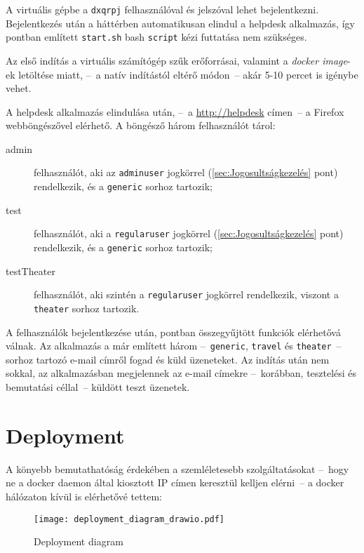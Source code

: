 A virtuális gépbe a \texttt{dxqrpj} felhasználóval és jelszóval lehet bejelentkezni. Bejelentkezés után a háttérben automatikusan elindul a helpdesk alkalmazás, így  pontban említett \texttt{start.sh} bash \texttt{script} kézi futtatása nem szükséges.

Az első indítás a virtuális számítógép szűk erőforrásai, valamint a \emph{docker image}-ek letöltése miatt, --~a natív indítástól eltérő módon~-- akár 5-10 percet is igénybe vehet.

A helpdesk alkalmazás elindulása után, --~a \href{http://helpdesk}{http://helpdesk} címen~-- a Firefox webböngészővel elérhető. A böngésző három felhasználót tárol:
\begin{description}
	\item[admin] felhasználót, aki az \texttt{admin\textunderscore user} jogkörrel (\ref{sec:Jogosultságkezelés} pont) rendelkezik, és a \texttt{generic} sorhoz tartozik;
	\item[test] felhasználót, aki a \texttt{regular\textunderscore user} jogkörrel (\ref{sec:Jogosultságkezelés} pont) rendelkezik, és a \texttt{generic} sorhoz tartozik;
	\item[testTheater] felhasználót, aki szintén a \texttt{regular\textunderscore user} jogkörrel rendelkezik, viszont a \texttt{theater} sorhoz tartozik.
\end{description}
 
A felhasználók bejelentkezése után,  pontban összegyűjtött funkciók elérhetővá válnak. Az alkalmazás a már említett három --~\texttt{generic}, \texttt{travel} és \texttt{theater}~-- sorhoz tartozó e-mail címről fogad és küld üzeneteket. Az indítás után nem sokkal, az alkalmazásban megjelennek az e-mail címekre --~korábban, tesztelési és bemutatási céllal~-- küldött teszt üzenetek.

\section{Deployment}
A könyebb bemutathatóság érdekében a szemléletesebb szolgáltatásokat --~hogy ne a docker daemon által kiosztott IP címen keresztül kelljen elérni~-- a docker hálózaton kívül is elérhetővé tettem:



\begin{figure}[hbt] 
	\centering
	\texttt{[image: deployment\_diagram\_drawio.pdf]}
	\caption[Deployment diagram]{Deployment diagram}
	\label{fig:deployment_diagram}
\end{figure}


